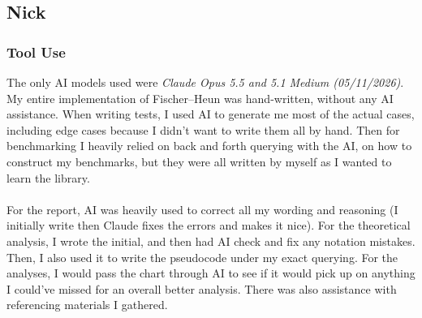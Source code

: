 \documentclass{article}
\theoremstyle{definition}
\begin{document}
\subsection{Nick}
\subsubsection{Tool Use}
The only AI models used were \textit{Claude Opus 5.5 and 5.1 Medium (05/11/2026)}. My entire implementation of Fischer--Heun was hand-written, without any AI assistance.  When writing tests, I used AI to generate me most of the actual cases, including edge cases because I didn't want to write them all by hand.  Then for benchmarking I heavily relied on back and forth querying with the AI, on how to construct my benchmarks, but they were all written by myself as I wanted to learn the library.
\\
\\
For the report, AI was heavily used to correct all my wording and reasoning (I initially write then Claude fixes the errors and makes it nice).  For the theoretical analysis, I wrote the initial, and then had AI check and fix any notation mistakes.  Then, I also used it to write the pseudocode under my exact querying.  For the analyses, I would pass the chart through AI to see if it would pick up on anything I could've missed for an overall better analysis.  There was also assistance with referencing materials I gathered.
\end{document}
